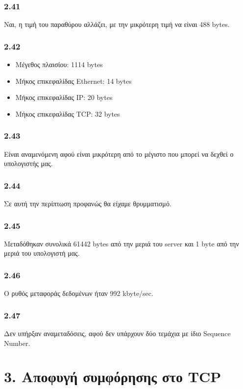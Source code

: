 		\subsubsection*{2.41} 
			Ναι, η τιμή του παραθύρου αλλάζει, με την μικρότερη τιμή να είναι 488 bytes.

		\subsubsection*{2.42} 
			\begin{itemize}
				\item Μέγεθος πλαισίου: 1114 bytes
				\item Μήκος επικεφαλίδας Ethernet: 14 bytes
				\item Μήκος επικεφαλίδας IP: 20 bytes
				\item Μήκος επικεφαλίδας TCP: 32 bytes
			\end{itemize}
		
		\subsubsection*{2.43} 
			Είναι αναμενόμενη αφού είναι μικρότερη από το μέγιστο που μπορεί να δεχθεί ο υπολογιστής μας.
		
		\subsubsection*{2.44}
			Σε αυτή την περίπτωση προφανώς θα είχαμε θρυμματισμό.
		 
		\subsubsection*{2.45} 
			Μεταδόθηκαν συνολικά 61442 bytes από την μεριά του server και 1 byte από την μεριά του υπολογιστή μας.
		
		\subsubsection*{2.46} 
			Ο ρυθός μεταφοράς δεδομένων ήταν 992 kbyte/sec.
		
		\subsubsection*{2.47} 
			Δεν υπήρξαν αναμεταδόσεις, αφού δεν υπάρχουν δύο τεμάχια με ίδιο Sequence Number.

	\section*{3. Αποφυγή συμφόρησης στο TCP}
		
